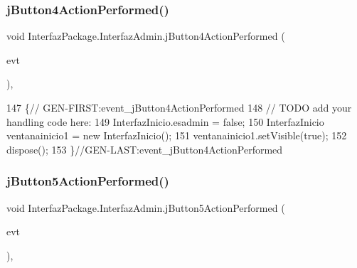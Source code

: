 \subsubsection{\texorpdfstring{j\+Button4\+Action\+Performed()}{jButton4ActionPerformed()}}
{\footnotesize\ttfamily void Interfaz\+Package.\+Interfaz\+Admin.\+j\+Button4\+Action\+Performed (\begin{DoxyParamCaption}\item[{java.\+awt.\+event.\+Action\+Event}]{evt }\end{DoxyParamCaption})\hspace{0.3cm}{\ttfamily [inline]}, {\ttfamily [private]}}


\begin{DoxyCode}
147                                                                          \{\textcolor{comment}{//
      GEN-FIRST:event\_jButton4ActionPerformed}
148         \textcolor{comment}{// TODO add your handling code here:}
149         InterfazInicio.esadmin = \textcolor{keyword}{false};
150         InterfazInicio ventanainicio1 = \textcolor{keyword}{new} InterfazInicio();
151         ventanainicio1.setVisible(\textcolor{keyword}{true});
152         dispose();
153     \}\textcolor{comment}{//GEN-LAST:event\_jButton4ActionPerformed}
\end{DoxyCode}
\mbox{\label{class_interfaz_package_1_1_interfaz_admin_a25699f2c1e5c4e59cac723216e386837}} 
\subsubsection{\texorpdfstring{j\+Button5\+Action\+Performed()}{jButton5ActionPerformed()}}
{\footnotesize\ttfamily void Interfaz\+Package.\+Interfaz\+Admin.\+j\+Button5\+Action\+Performed (\begin{DoxyParamCaption}\item[{java.\+awt.\+event.\+Action\+Event}]{evt }\end{DoxyParamCaption})\hspace{0.3cm}{\ttfamily [inline]}, {\ttfamily [private]}}


